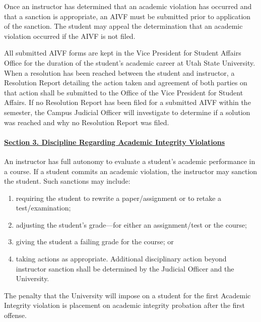 \documentclass[10pt,fleqn]{article}
\begin{document}
Once an instructor has determined that an academic violation has occurred and
that a sanction is appropriate, an AIVF must be submitted prior to application
of the sanction. The student may appeal the determination that an academic
violation occurred if the AIVF is not filed.

All submitted AIVF forms are kept in the Vice President for Student Affairs
Office for the duration of the student's academic career at Utah State
University. When a resolution has been reached between the student and
instructor, a Resolution Report detailing the action taken and agreement of
both parties on that action shall be submitted to the Office of the Vice
President for Student Affairs. If no Resolution Report has been filed for a
submitted AIVF within the semester, the Campus Judicial Officer will investigate
to determine if a solution was reached and why no Resolution Report was filed.

\paragraph{\underline{Section 3. Discipline Regarding Academic Integrity
Violations}} An instructor has full autonomy to evaluate a student's academic
performance in a course. If a student commits an academic violation, the
instructor may sanction the student. Such sanctions may include:
\begin{enumerate}
  \item requiring the student to rewrite a paper/assignment or to retake a
        test/examination;
  \item adjusting the student's grade—for either an assignment/test or the
        course;
  \item giving the student a failing grade for the course; or
  \item taking actions as appropriate. Additional disciplinary action beyond
        instructor sanction shall be determined by the Judicial Officer and the
        University.
\end{enumerate}

The penalty that the University will impose on a student for the first Academic
Integrity violation is placement on academic integrity probation after the first
offense.
\end{document}
